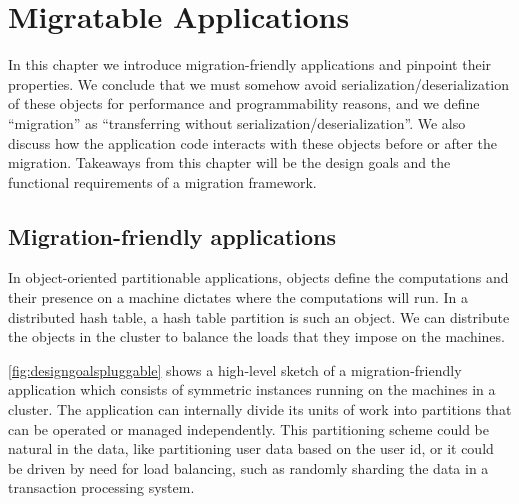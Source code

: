 \chapter{Migratable Applications}
\label{chap:migratableapps}

In this chapter we introduce migration-friendly applications and pinpoint
their properties. We conclude that
we must somehow avoid serialization/deserialization of these objects for
performance and programmability reasons, and we define ``migration'' as
``transferring without serialization/deserialization''.
We also discuss how the
application code interacts with these objects before or after the migration.
Takeaways from this chapter will be the design goals and the functional
requirements of a migration framework.
%
%
%
%


\section{Migration-friendly applications}
\label{sec:themigfriendlyapps}
In object-oriented partitionable applications, objects define the
computations and their presence on a machine dictates where the
computations will run. In a distributed hash table, a hash table partition
is such an object. We can distribute the objects in the cluster to balance
the loads that they impose on the machines.

\autoref{fig:designgoalspluggable} shows a high-level sketch of a
migration-friendly application which consists of symmetric instances
running on the machines in a cluster. The application can internally
divide its units of work into partitions that can be operated or
managed independently.
This partitioning scheme could be natural in the data, like
partitioning user data based on the user id, or it could be driven
by need for load balancing, such as randomly sharding the data
in a transaction processing system.


